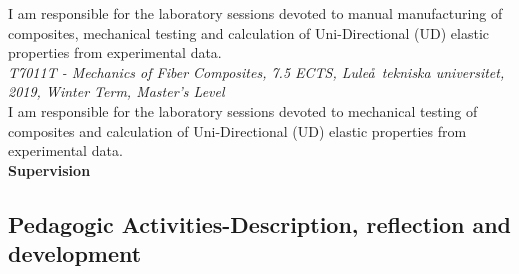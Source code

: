 \documentclass[
  a4paper, 
]{fortysecondscv}
\begin{document}
I am responsible for the laboratory sessions devoted to manual manufacturing of composites, mechanical testing and calculation of Uni-Directional (UD) elastic properties from experimental data.\\[3pt]
\textit{T7011T - Mechanics of Fiber Composites, 7.5 ECTS, Lule\aa\ tekniska universitet, 2019, Winter Term, Master's Level}\\
I am responsible for the laboratory sessions devoted to mechanical testing of composites and calculation of Uni-Directional (UD) elastic properties from experimental data.\\[3pt]
\textbf{Supervision}\\[3pt]

\subsection{Pedagogic Activities-Description, reflection and development}
\end{document}
